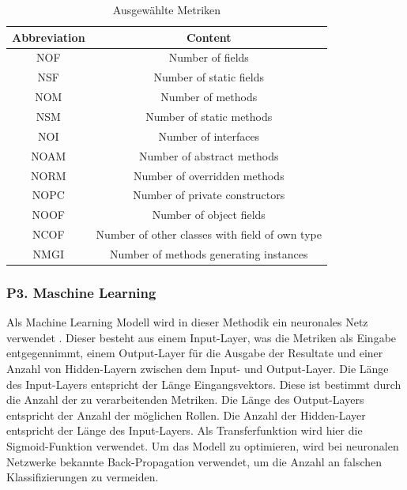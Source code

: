 \documentclass[conference]{IEEEtran}
\begin{document}
\begin{table}[h!]
    \begin{tabular}{ |c|c| }
        \hline
        Abbreviation & Content                                        \\
        \hline
        NOF          & Number of fields                               \\
        \hline
        NSF          & Number of static fields                        \\
        \hline
        NOM          & Number of methods                              \\
        \hline
        NSM          & Number of static methods                       \\
        \hline
        NOI          & Number of interfaces                           \\
        \hline
        NOAM         & Number of abstract methods                     \\
        \hline
        NORM         & Number of overridden methods                   \\
        \hline
        NOPC         & Number of private constructors                 \\
        \hline
        NOOF         & Number of object fields                        \\
        \hline
        NCOF         & Number of other classes with field of own type \\
        \hline
        NMGI         & Number of methods generating instances         \\
        \hline
    \end{tabular}
    \caption{Ausgewählte Metriken}
    \label{tabel:1}
\end{table}


\subsubsection*{P3. Maschine Learning}

Als Machine Learning Modell wird in dieser Methodik ein neuronales Netz verwendet \cite[p. 5]{dodmetrics}. Dieser besteht aus einem Input-Layer, was die Metriken als Eingabe entgegennimmt, einem Output-Layer für die Ausgabe der Resultate und einer Anzahl von Hidden-Layern zwischen dem Input- und Output-Layer.
Die Länge des Input-Layers entspricht der Länge Eingangsvektors. Diese ist bestimmt durch die Anzahl der zu verarbeitenden Metriken. Die Länge des Output-Layers entspricht der Anzahl der möglichen Rollen.
Die Anzahl der Hidden-Layer entspricht der Länge des Input-Layers. Als Transferfunktion wird hier die Sigmoid-Funktion verwendet.
Um das Modell zu optimieren, wird bei neuronalen Netzwerke bekannte Back-Propagation verwendet, um die Anzahl an falschen Klassifizierungen zu vermeiden.
\end{document}
